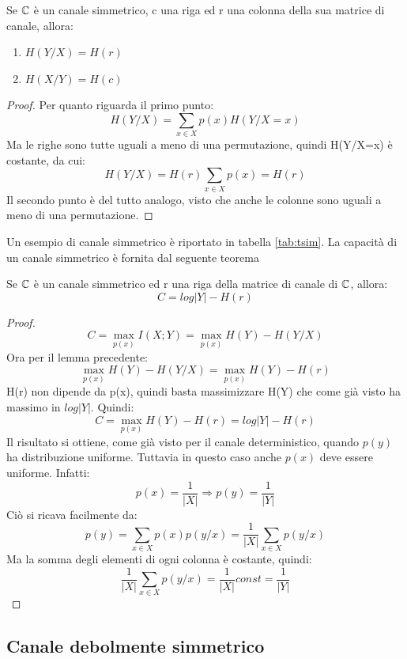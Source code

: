 \begin{lemma}
 Se $\mathbb{C}$ è un canale simmetrico, c una riga ed r una colonna della sua matrice di canale, allora:
 \begin{enumerate}
  \item $H(Y/X)=H(r)$
  \item $H(X/Y)=H(c)$
 \end{enumerate}
 \begin{proof}
  \mbox{}

  \noindent
  Per quanto riguarda il primo punto:
  \[
   H(Y/X)=\sum_{x \in X}p(x)H(Y/X=x)
  \]
  Ma le righe sono tutte uguali a meno di una permutazione, quindi H(Y/X=x) è costante, da cui:
  \[
   H(Y/X)=H(r)\sum_{x \in X}p(x)=H(r)
  \]
  Il secondo punto è del tutto analogo, visto che anche le colonne sono uguali a meno di una permutazione.
 \end{proof}

\end{lemma}

\noindent
Un esempio di canale simmetrico è riportato in tabella \ref{tab:tsim}.
La capacità di un canale simmetrico è fornita dal seguente teorema

\begin{teorema}
 Se $\mathbb{C}$ è un canale simmetrico ed r una riga della matrice di canale di $\mathbb{C}$, allora:
 \[
  C=log|Y| - H(r)
 \]
 \begin{proof}
\[
  C=\max_{p(x)} I(X;Y)=\max_{p(x)} H(Y)-H(Y/X)
\]
 Ora per il lemma precedente:
 \[
  \max_{p(x)} H(Y)-H(Y/X)=\max_{p(x)} H(Y)-H(r)
 \]
 H(r) non dipende da p(x), quindi basta massimizzare H(Y) che come già visto ha massimo in $log|Y|$. Quindi:
 \[
  C=\max_{p(x)} H(Y)-H(r)=log |Y| - H(r)
 \]
 Il risultato si ottiene, come già visto per il canale deterministico, quando $p(y)$ ha distribuzione uniforme.
 Tuttavia in questo caso anche $p(x)$ deve essere uniforme. Infatti:
 \[
  p(x)=\frac{1}{|X|} \Rightarrow p(y)=\frac{1}{|Y|}
 \]
 Ciò si ricava facilmente da:
 \[
  p(y)=\sum_{x \in X} p(x)p(y/x)=\frac{1}{|X|} \sum_{x \in X}p(y/x)
 \]
 Ma la somma degli elementi di ogni colonna è costante, quindi:
 \[
  \frac{1}{|X|} \sum_{x \in X}p(y/x)=\frac{1}{|X|} const=\frac{1}{|Y|}
 \]
 \end{proof}

\end{teorema}

\subsection{Canale debolmente simmetrico}

